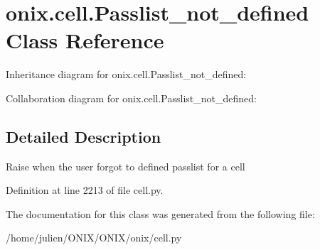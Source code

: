 \hypertarget{classonix_1_1cell_1_1Passlist__not__defined}{}\section{onix.\+cell.\+Passlist\+\_\+not\+\_\+defined Class Reference}
\label{classonix_1_1cell_1_1Passlist__not__defined}


Inheritance diagram for onix.\+cell.\+Passlist\+\_\+not\+\_\+defined\+:


Collaboration diagram for onix.\+cell.\+Passlist\+\_\+not\+\_\+defined\+:


\subsection{Detailed Description}
\begin{DoxyVerb}Raise when the user forgot to defined passlist for a cell\end{DoxyVerb}
 

Definition at line 2213 of file cell.\+py.



The documentation for this class was generated from the following file\+:\begin{DoxyCompactItemize}
\item 
/home/julien/\+O\+N\+I\+X/\+O\+N\+I\+X/onix/cell.\+py\end{DoxyCompactItemize}
